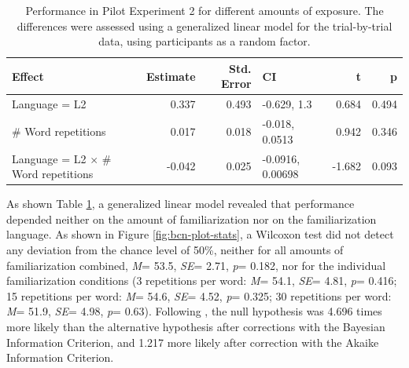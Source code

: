 \documentclass[]{article}
\newcommand{\p}{{\em p\/}}
\newcommand{\M}{{\em M\/}}
\newcommand{\SE}{{\em SE\/}}
\begin{document}
\begin{table}

\caption{\label{tab:bcn-glmm-print}Performance in Pilot Experiment 2 for different amounts of exposure. The differences were assessed using a generalized linear model for the trial-by-trial data, using participants as a random factor.}
\centering
\begin{tabular}[t]{lrrlrr}
\toprule
Effect & Estimate & Std. Error & CI & t & p\\
\midrule
Language = L2 & 0.337 & 0.493 & -0.629, 1.3 & 0.684 & 0.494\\
\# Word repetitions & 0.017 & 0.018 & -0.018, 0.0513 & 0.942 & 0.346\\
Language = L2 $\times$ \# Word repetitions & -0.042 & 0.025 & -0.0916, 0.00698 & -1.682 & 0.093\\
\bottomrule
\end{tabular}
\end{table}

As shown Table \ref{tab:bcn-glmm-print}, a generalized linear model revealed that performance depended neither on the amount of familiarization nor on the familiarization language. As shown in Figure \ref{fig:bcn-plot-stats}, a Wilcoxon test did not detect any deviation from the chance level of 50\%, neither for all amounts of familiarization combined, \M = 53.5, \SE = 2.71, \p = 0.182, nor for the individual familiarization conditions (3 repetitions per word: \M = 54.1, \SE = 4.81, \p = 0.416; 15 repetitions per word: \M = 54.6, \SE = 4.52, \p = 0.325; 30 repetitions per word: \M = 51.9, \SE = 4.98, \p = 0.63). Following \citet{Glover2004}, the null hypothesis was 4.696 times more likely than the alternative hypothesis after corrections with the Bayesian Information Criterion, and 1.217 more likely after correction with the Akaike Information Criterion.
\end{document}
